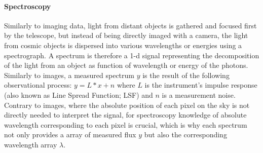 \documentclass[dvipsnames,table]{article}
\newcommand{\FL}[1]{{\color{magenta}FL: #1}}
\begin{document}

\paragraph{Spectroscopy} Similarly to imaging data, light from distant objects is gathered and focused first by the telescope, but instead of being directly imaged with a camera, the light from cosmic objects is dispersed into various wavelengths or energies using a spectrograph. A spectrum is therefore a 1-d signal representing the decomposition of the light from an object as function of wavelength or energy of the photons. Similarly to images, a measured spectrum $y$ is the result of the following observational process: $y = L \ast x + n$ where $L$ is the instrument's impulse response (also known as Line Spread Function; LSF) and $n$ is a measurement noise. Contrary to images, where the absolute position of each pixel on the sky is not directly needed to interpret the signal, for spectroscopy knowledge of absolute  wavelength corresponding to each pixel is crucial, which is why each spectrum not only provides a array of measured flux $y$ but also the corresponding wavelength array $\lambda$. 

\end{document}
